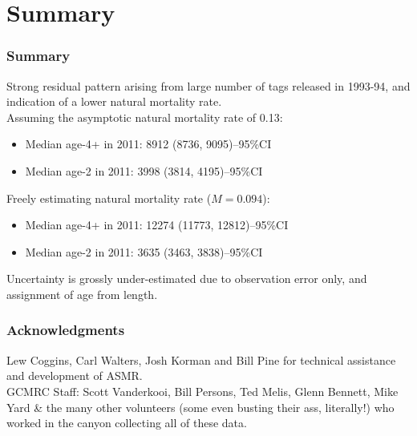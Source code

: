 \documentclass{beamer}
\begin{document}
\section{Summary} %
\label{sec:summary}
\begin{frame}[t]\frametitle{Summary}
	Strong residual pattern arising from large number of tags released in 1993-94, and indication of a lower natural mortality rate.\\
	\pause \medskip
	Assuming the asymptotic natural mortality rate of 0.13:\\
	\begin{itemize}
		\item     Median age-4+ in 2011: 8912  (8736, 9095)--95\%CI
		\item     Median age-2 in 2011: 3998  (3814, 4195)--95\%CI
	\end{itemize}
	\pause \medskip
	Freely estimating natural mortality rate ($M=0.094$):\\
	\begin{itemize}
		\item     Median age-4+ in 2011: 12274 (11773, 12812)--95\%CI
		\item     Median age-2 in 2011: 3635  (3463, 3838)--95\%CI
	\end{itemize}
	\pause \medskip
	Uncertainty is grossly under-estimated due to observation error only, and assignment of age from length.
\end{frame}
%
\begin{frame}[t]\frametitle{Acknowledgments}
	\vfill
	Lew Coggins, Carl Walters, Josh Korman and Bill Pine for technical assistance and development of ASMR.\\
	\vfill
	GCMRC Staff: Scott Vanderkooi, Bill Persons, Ted Melis, Glenn Bennett, Mike Yard \& the many other volunteers (some even busting their ass, literally!) who worked in the canyon collecting all of these data.
\end{frame}
\end{document}
